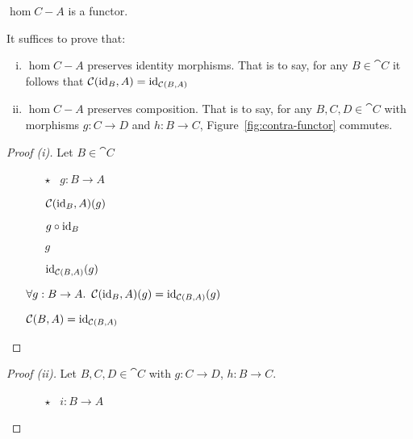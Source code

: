 \begin{prop}
  $\hom{C}{-}{A}$ is a functor.

  It suffices to prove that:
  \begin{enumerate}[(i)]
    \item $\hom{C}{-}{A}$ preserves identity morphisms. That is to say, for any $B\in\cat{C}$ it follows that $\mathcal{C}(\operatorname{id}_B, A) = \operatorname{id}_{\mathcal{C}(B, A)}$
    \item $\hom{C}{-}{A}$ preserves composition. That is to say, for any $B,C,D\in\cat{C}$ with morphisms $g : C \to D$
      and $h : B \to C$, Figure~\ref{fig:contra-functor} commutes.
  \end{enumerate}

  \begin{proof}[Proof (i)]
    Let $B\in\cat{C}$
    \begin{itemize}
      \item[\phs]
        \begin{itemize}
          \item[$\star$]
            \Let~$g : B \to A$
            \marginnote{\Hyp}
          \item[\phs]
            $\mathcal{C}(\operatorname{id}_B, A)(g)$

          \item[\eqs]
            $g\circ\operatorname{id}_B$
            \marginnote{\Def-\ref{def:contra-hom}}

          \item[\eqs]
            $g$
            \marginnote{\Def-$\id$}

          \item[\eqs]
            $\operatorname{id}_{\mathcal{C}(B, A)}(g)$
            \marginnote{\Def-$\id$}
        \end{itemize}

      \item[\imps]
        $\forall g : B \to A\ldotp~\mathcal{C}(\operatorname{id}_B, A)(g) = \operatorname{id}_{\mathcal{C}(B, A)}(g)$
        \marginnote{$\forall$-\Intro-$\star$}

      \item[\iffs]
        $\mathcal{C}(B, A) = \operatorname{id}_{\mathcal{C}(B, A)}$
        \marginnote{\Def-=}
        \qedhere
    \end{itemize}
  \end{proof}

  \begin{proof}[Proof (ii)]
    Let $B, C, D\in\cat{C}$ with ${g : C\to D}$, ${h : B\to C}$.
    \begin{itemize}
      \item[\phs]
        \begin{itemize}
          \item[$\star$] \Let~$i : B\to A$
            \marginnote{\Hyp}


\end{itemize}
\end{itemize}
\end{proof}
\end{prop}
